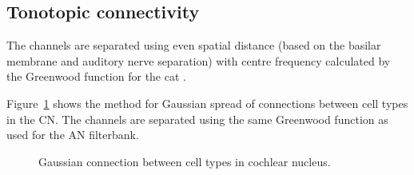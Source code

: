 
\subsection{Tonotopic connectivity}\label{sec:tonot-conn}

The channels are separated using even spatial distance (based on the
basilar membrane and auditory nerve separation) with centre frequency
calculated by the Greenwood function for the cat
\citep{Greenwood:1990}. 


Figure~\ref{fig:CNconn} shows the method for Gaussian spread of
connections between cell types in the CN\@.  The channels are separated
using the same Greenwood function as used for the AN filterbank.


\begin{figure}[tbh]
  \begin{center}
    \caption{Gaussian connection between cell types in cochlear
      nucleus.}
    \label{fig:CNconn}
  \end{center}
\end{figure}






